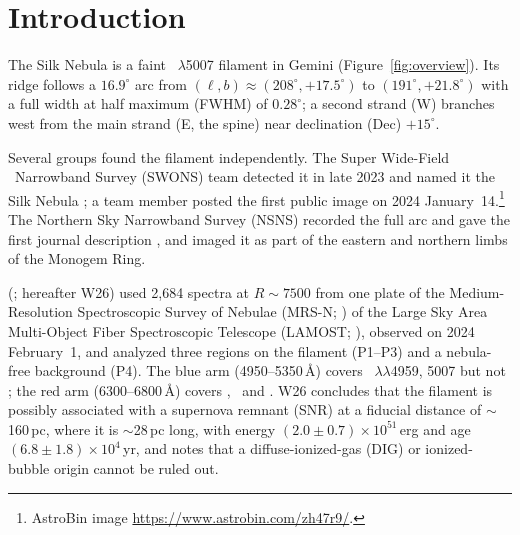 
\section{Introduction}\label{sec:intro}

The Silk Nebula is a faint \Oiii~$\lambda$5007 filament in Gemini (Figure~\ref{fig:overview}). Its ridge follows a $16.9^\circ$ arc from $(\ell,b)\approx(208^\circ,+17.5^\circ)$ to $(191^\circ,+21.8^\circ)$ with a full width at half maximum (FWHM) of $0.28^\circ$; a second strand (W) branches west from the main strand (E, the spine) near declination (Dec) $+15^\circ$.

Several groups found the filament independently. The Super Wide-Field \Oiii\ Narrowband Survey (SWONS) team detected it in late 2023 and named it the Silk Nebula \citep{QHYCCD2024}; a team member posted the first public image on 2024 January~14.\footnote{AstroBin image \url{https://www.astrobin.com/zh47r9/}.} The Northern Sky Narrowband Survey (NSNS) recorded the full arc and gave the first journal description \citep{Ziegenbalg2025}, and \citet{Fesen2026} imaged it as part of the eastern and northern limbs of the Monogem Ring.

\citeauthor{Wu2026} (\citeyear{Wu2026}; hereafter W26) used 2,684 spectra at $R\sim7500$ from one plate of the Medium-Resolution Spectroscopic Survey of Nebulae (MRS-N; \citealt{Wu2022}) of the Large Sky Area Multi-Object Fiber Spectroscopic Telescope (LAMOST; \citealt{Cui2012}), observed on 2024 February~1, and analyzed three regions on the filament (P1--P3) and a nebula-free background (P4). The blue arm (4950--5350\,\AA) covers \Oiii~$\lambda\lambda$4959, 5007 but not \Hb; the red arm (6300--6800\,\AA) covers \Ha, \Nii\ and \Sii. W26 concludes that the filament is possibly associated with a supernova remnant (SNR) at a fiducial distance of $\sim$160\,pc, where it is $\sim$28\,pc long, with energy $(2.0\pm0.7)\times10^{51}$\,erg and age $(6.8\pm1.8)\times10^{4}$\,yr, and notes that a diffuse-ionized-gas (DIG) or ionized-bubble origin cannot be ruled out.


